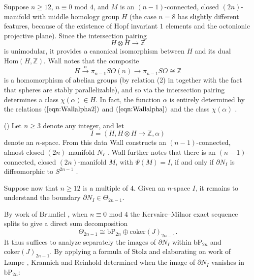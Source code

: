 \begin{rec} \label{rec:chi}
Suppose $n \ge 12$, $n \equiv 0$ mod $4$, and $M$ is an $(n-1)$-connected, closed $(2n)$-manifold with middle homology group $H$ (the case $n=8$ has slightly different features, because of the existence of Hopf invariant $1$ elements and the octonionic projective plane).  Since the intersection pairing
$$H \otimes H \to \mathbb{Z}$$
is unimodular, it provides a canonical isomorphism between $H$ and its dual $\mathrm{Hom}(H,\mathbb{Z})$.
Wall notes \cite[Case 1]{Wall62} that the composite
$$H \stackrel{\alpha}{\longrightarrow} \pi_{n-1} SO(n) \longrightarrow \pi_{n-1} SO \cong \mathbb{Z}$$
is a homomorphism of abelian groups (by relation (2) in  together with the fact that spheres are stably parallelizable), and so via the intersection pairing determines a class $\chi(\alpha) \in H$.
In fact, the function $\alpha$ is entirely determined by the relations $(\ref{eqn:Wallalpha2})$ and $(\ref{eqn:Wallalpha})$ and the class $\chi(\alpha)$ \cite[p. 174]{Wall62}.
\end{rec}

\begin{cnstr}(\cite{Wall62}) \label{cnstr:Wall}
Let $n \ge 3$ denote any integer, and let 
$$I = (H,H \otimes H \to \mathbb{Z},\alpha)$$
denote an $n$-space.  From this data Wall constructs an $(n-1)$-connected, almost closed $(2n)$-manifold $N_I$ \cite[p.170]{Wall62}.
Wall further notes that there is an $(n-1)$-connected, closed $(2n)$-manifold $M$, with $\Psi(M)=I$, if and only if $\partial N_I$ is diffeomorphic to $S^{2n-1}$ \cite[p.177]{Wall62}.
\end{cnstr}

Suppose now that $n \ge 12$ is a multiple of $4$.
Given an $n$-space $I$, it remains to understand the boundary $\partial N_I \in \Theta_{2n-1}$.

By work of Brumfiel \cite{Brumfiel}, when $n \equiv 0$ mod $4$ the Kervaire--Milnor exact sequence splits to give a direct sum decomposition
$$\Theta_{2n-1} \cong \mathrm{bP}_{2n} \oplus \mathrm{coker}(J)_{2n-1}.$$
It thus suffices to analyze separately the images of $\partial N_I$ within $\mathrm{bP}_{2n}$ and $\mathrm{coker}(J)_{2n-1}$.
By applying a formula of Stolz \cite{StolzbP} and elaborating on work of Lampe \cite{Lampe}, Krannich and Reinhold \cite[Lemma 2.7]{KrannichCharacteristic} determined when the image of $\partial N_I$ vanishes in $\mathrm{bP}_{2n}$:

